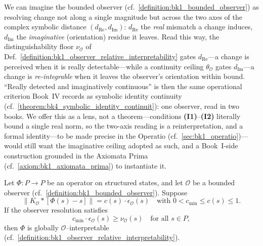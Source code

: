 \begin{scholium}
\label{scholium:bk1_interpretability_two_axes}
We can imagine the bounded observer (cf.~\ref{definition:bk1_bounded_observer})
as resolving change not along a single magnitude but across the two axes of the
complex symbolic distance \((d_{\mathrm{Re}}, d_{\mathrm{Im}})\):
\(d_{\mathrm{Re}}\) the \emph{real} mismatch a change induces, \(d_{\mathrm{Im}}\)
the \emph{imaginative} (orientation) residue it leaves. Read this way, the
distinguishability floor \(\nu_{\mathcal{O}}\) of
Def.~\ref{definition:bk1_observer_relative_interpretability} gates
\(d_{\mathrm{Re}}\)---a change is perceived when it is really detectable---while
a continuity ceiling \(\theta_{\mathcal{O}}\) gates \(d_{\mathrm{Im}}\)---a change
is \emph{re-integrable} when it leaves the observer's orientation within bound.
``Really detected and imaginatively continuous'' is then the same operational
criterion Book~IV records as symbolic identity continuity
(cf.~\ref{theorem:bk4_symbolic_identity_continuit}): one observer, read in two
books. We offer this as a lens, not a theorem---conditions
\textbf{(I1)}--\textbf{(I2)} literally bound a single real norm, so the two-axis
reading is a reinterpretation, and a formal identity---to be made precise in the
Operatio (cf.~\ref{sec:bk1_operatio})---would still want the imaginative ceiling
adopted as such, and a Book~I-side construction grounded in the Axiomata Prima
(cf.~\ref{axiom:bk1_axiomata_prima}) to instantiate it.
\end{scholium}

\vspace{1em}

\begin{lemma}
\label{lemma:bk1_bounded_approximation_and_interpretability}

Let $\Phi : P \to P$ be an operator on structured states, and let $\mathcal{O}$ be a bounded observer (cf.~\ref{definition:bk1_bounded_observer}).  
Suppose
\[
\|K_{\mathcal{O}} \ast [\Phi(s) - s]\| = c(s) \cdot \epsilon_{\mathcal{O}}(s)
\quad \text{with } 0 < c_{\min} \le c(s) \le 1.
\]
If the observer resolution satisfies
\[
c_{\min} \cdot \epsilon_{\mathcal{O}}(s) \ge \nu_{\mathcal{O}}(s)
\quad \text{for all } s \in P,
\]
then $\Phi$ is globally $\mathcal{O}$–interpretable (cf.~\ref{definition:bk1_observer_relative_interpretability}).

\end{lemma}

